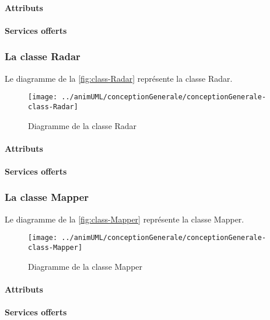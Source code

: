 \paragraph{Attributs}
\classExplorerProperties
\paragraph{Services offerts}
\classExplorerOperations
\subsubsection{La classe Radar}

Le diagramme de la \autoref{fig:class-Radar} représente la classe Radar.
\begin{figure}[H]
	\centering
	\texttt{[image: ../animUML/conceptionGenerale/conceptionGenerale-class-Radar]}
	\caption{Diagramme de la classe Radar}
	\label{fig:class-Radar}
\end{figure}


\paragraph{Attributs}
\classRadarProperties
\paragraph{Services offerts}
\classRadarOperations
\subsubsection{La classe Mapper}

Le diagramme de la \autoref{fig:class-Mapper} représente la classe Mapper.
\begin{figure}[H]
	\centering
	\texttt{[image: ../animUML/conceptionGenerale/conceptionGenerale-class-Mapper]}
	\caption{Diagramme de la classe Mapper}
	\label{fig:class-Mapper}
\end{figure}


\paragraph{Attributs}
\classMapperProperties
\paragraph{Services offerts}
\classMapperOperations
